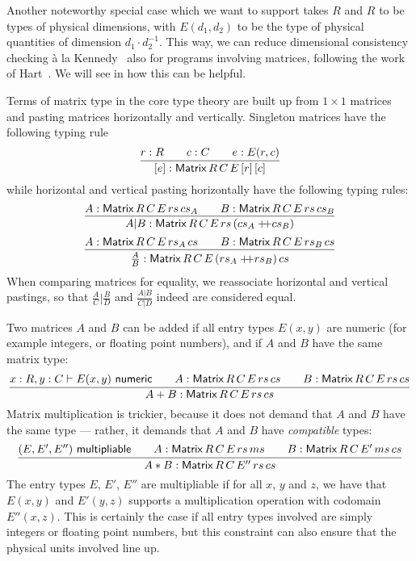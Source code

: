 \documentclass{ws-procs9x6}
\newcommand{\isadd}[1]{#1\ \textsf{numeric}}
\newcommand{\ismult}[3]{(#1, #2, #3)\ \textsf{multipliable}}
\newcommand{\append}{+\!\!\!+}
\newcommand{\hjux}[2]{{#1}|{#2}}
\newcommand{\vjux}[2]{\frac{#1}{#2}}
\newcommand{\Matrix}[5]{\mathsf{Matrix}\,#1\,#2\,#3\,#4\,#5}
\newcommand{\remph}{\emph}
\begin{document}
Another noteworthy special case which we want to support takes $R$ and
$R$ to be types of physical dimensions, with $E(d_1, d_2)$ to be the
type of physical quantities of dimension $d_1 \cdot d_2^{-1}$.
%
This way, we can reduce dimensional consistency checking \`a la
Kennedy~\cite{kennedyUOM} also for programs involving matrices,
following the work of Hart~\cite{hart}.
%
We will see in  how this can be helpful.

Terms of matrix type in the core type theory are built up from
$1 \times 1$ matrices and pasting matrices horizontally and vertically.
%
Singleton matrices have the following typing rule
\[
  \infer{[e] : \Matrix{R}{C}{E}{[r]}{[c]}}
    {r : R
      &\quad
      c : C
      &\quad
      e : E(r, c)
    }
\]
%
while horizontal and vertical pasting horizontally have the following
typing rules:
\[
  \infer{\hjux{A}{B} : \Matrix{R}{C}{E}{rs}{(cs_A \append cs_B)}}
  {
    A : \Matrix{R}{C}{E}{rs}{cs_A}
    &\quad
    B : \Matrix{R}{C}{E}{rs}{cs_B}
  }
\]
\[
  \infer{\vjux{A}{B} : \Matrix{R}{C}{E}{(rs_A \append rs_B)}{cs}}
  {
    A : \Matrix{R}{C}{E}{rs_A}{cs}
    &\quad
    B : \Matrix{R}{C}{E}{rs_B}{cs}
  }
\]
When comparing matrices for equality, we reassociate horizontal and
vertical pastings, so that $\hjux{\vjux{A}{C}}{\vjux{B}{D}}$ and
$\vjux{\hjux{A}{B}}{\hjux{C}{D}}$ indeed are considered equal.

Two matrices $A$ and $B$ can be added if all entry types $E(x, y)$ are
numeric (for example integers, or floating point numbers), and if $A$
and $B$ have the same matrix type:
%
\[
  \infer{A + B : \Matrix{R}{C}{E}{rs}{cs}}
  {
    x : R, y : C \vdash \isadd{E(x, y)}
    &\quad
    A : \Matrix{R}{C}{E}{rs}{cs}
    &\quad
    B : \Matrix{R}{C}{E}{rs}{cs}
  }
\]
%
Matrix multiplication is trickier, because it does not demand that $A$
and $B$ have the same type --- rather, it demands that $A$ and $B$
have \remph{compatible} types:
%
\[
  \infer{A * B : \Matrix{R}{C}{E''}{rs}{cs}}
  {
    \ismult{E}{E'}{E''}
    &\quad
    A : \Matrix{R}{C}{E}{rs}{ms}
    &\quad
    B : \Matrix{R}{C}{E'}{ms}{cs}
  }
\]
The entry types $E$, $E'$, $E''$ are multipliable if for all $x$, $y$
and $z$, we have that $E(x, y)$ and $E'(y, z)$ supports a
multiplication operation with codomain $E''(x, z)$.
%
This is certainly the case if all entry types involved are simply
integers or floating point numbers, but this constraint can also
ensure that the physical units involved line up.


\end{document}
